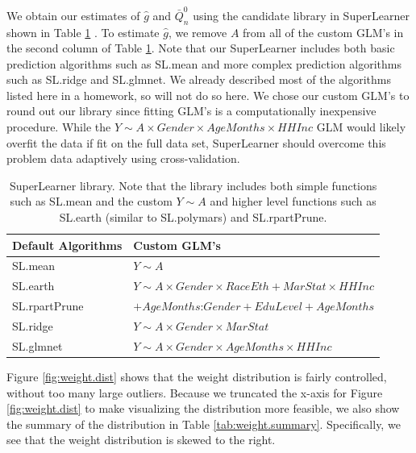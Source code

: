 \documentclass{article}
\begin{document}
We obtain our estimates of $\hat{g}$ and $\bar{Q}_n^0$ using the candidate library in SuperLearner shown in Table \ref{tab:sl.lib} \cite{superlearner}. To estimate $\hat{g}$, we remove $A$ from all of the custom GLM's in the second column of Table \ref{tab:sl.lib}. Note that our SuperLearner includes both basic prediction algorithms such as SL.mean and more complex prediction algorithms such as SL.ridge and SL.glmnet. We already described most of the algorithms listed here in a homework, so will not do so here. We chose our custom GLM's to round out our library since fitting GLM's is a computationally inexpensive procedure. While the $Y \sim A \times Gender \times AgeMonths \times HHInc$ GLM would likely overfit the data if fit on the full data set, SuperLearner should overcome this problem data adaptively using cross-validation.
\begin{table}
\begin{tabular}{l | l}
Default Algorithms & Custom GLM's \\
\hline
SL.mean & $Y \sim A$ \\
SL.earth & $Y \sim A \times Gender \times RaceEth + MarStat \times HHInc$ \\
SL.rpartPrune & $+ AgeMonths$:$Gender + EduLevel + AgeMonths $ \\
SL.ridge & $Y \sim A \times Gender \times MarStat$ \\
SL.glmnet &  $Y \sim A \times Gender \times AgeMonths \times HHInc$ \\
\end{tabular}
\caption{SuperLearner library. Note that the library includes both simple functions such as SL.mean and the custom $Y\sim A$ and higher level functions such as SL.earth (similar to SL.polymars) and SL.rpartPrune.}
\label{tab:sl.lib}
\end{table}

Figure \ref{fig:weight.dist} shows that the weight distribution is fairly controlled, without too many large outliers. Because we truncated the x-axis for Figure \ref{fig:weight.dist} to make visualizing the distribution more feasible, we also show the summary of the distribution in Table \ref{tab:weight.summary}. Specifically, we see that the weight distribution is skewed to the right.
\end{document}
